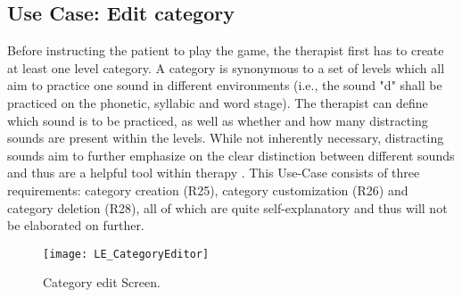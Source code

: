 \documentclass[draft,final]{vutinfth} %
\begin{document}
\subsection{Use Case: Edit category}
Before instructing the patient to play the game, the therapist first has to create at least one level category. A category is synonymous to a set of levels which all aim to practice one sound in different environments (i.e., the sound "d" shall be practiced on the phonetic, syllabic and word stage). The therapist can define which sound is to be practiced, as well as whether and how many distracting sounds are present within the levels. While not inherently necessary, distracting sounds aim to further emphasize on the clear distinction between different sounds and thus are a helpful tool within therapy \cite{proestler2023}. This Use-Case consists of three requirements: category creation (R25), category customization (R26) and category deletion (R28), all of which are quite self-explanatory and thus will not be elaborated on further.

\begin{figure}
  \centering
  \texttt{[image: LE\_CategoryEditor]}
  \caption{Category edit Screen.}
\end{figure}
\end{document}
